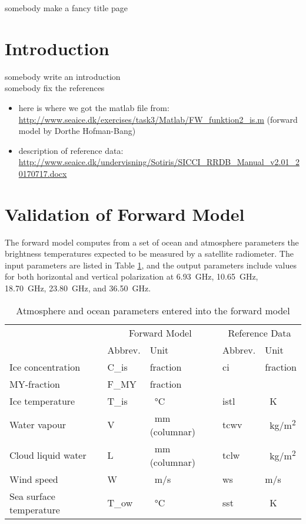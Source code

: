 \documentclass[11pt, a4paper]{article}
\begin{document}
\begin{titlepage}
\centering
{somebody make a fancy title page}
\end{titlepage}






\section*{Introduction}

somebody write an introduction \\
somebody fix the references

\begin{itemize}
\item here is where we got the matlab file from: \url{http://www.seaice.dk/exercises/task3/Matlab/FW_funktion2_is.m} (forward model by Dorthe Hofman-Bang)
\item description of reference data: \url{http://www.seaice.dk/undervisning/Sotiris/SICCI_RRDB_Manual_v2.01_20170717.docx}
\end{itemize}




\section{Validation of Forward Model}

The forward model computes from a set of ocean and atmosphere parameters the brightness temperatures expected to be measured by a satellite radiometer. The input parameters are listed in Table \ref{tab:input_parameters}, and the output parameters include values for both horizontal and vertical polarization at \SI{6.93}{GHz}, \SI{10.65}{GHz}, \SI{18.70}{GHz}, \SI{23.80}{GHz}, and \SI{36.50}{GHz}.

\begin{table}[h!]
\centering
\begin{tabular}{@{}p{4cm} p{1.8cm}p{2.8cm}p{1.8cm}p{1.8cm}@{}}
\tabularnewline
& \multicolumn{2}{c}{Forward Model} & \multicolumn{2}{c}{Reference Data}
\tabularnewline
\cmidrule(r{1em}){2-3} \cmidrule(l{1em}){4-5}
& Abbrev. & Unit & Abbrev. & Unit
\tabularnewline
\midrule
Ice concentration	& C\_is	& fraction		& ci	& fraction	\\
MY-fraction		& F\_MY	& fraction		& 	& 		\\
Ice temperature		& T\_is	& \SI{}{\degreeCelsius}	& istl	& \SI{}{K}	\\
Water vapour		& V	& \SI{}{mm} (columnar)	& tcwv	& \SI{}{kg/m^2}	\\
Cloud liquid water	& L	& \SI{}{mm} (columnar)	& tclw	& \SI{}{kg/m^2}	\\
Wind speed		& W	& \SI{}{m/s}		& ws	& m/s		\\
Sea surface temperature	& T\_ow	& \SI{}{\degreeCelsius}	& sst	& \SI{}{K}	\\
\midrule
\end{tabular}
\caption{Atmosphere and ocean parameters entered into the forward model}
\label{tab:input_parameters}
\end{table}
\end{document}
